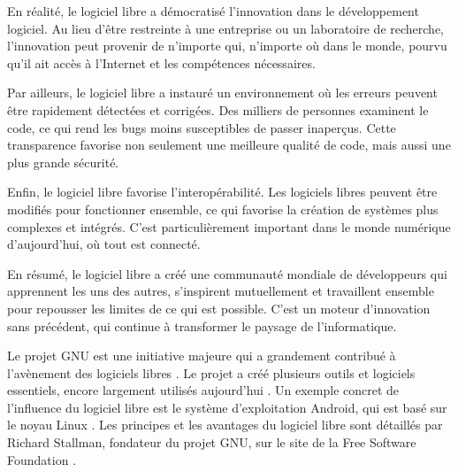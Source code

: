 En réalité, le logiciel libre a démocratisé l'innovation dans le développement logiciel. Au lieu d'être restreinte à une entreprise ou un laboratoire de recherche, l'innovation peut provenir de n'importe qui, n'importe où dans le monde, pourvu qu'il ait accès à l'Internet et les compétences nécessaires.

Par ailleurs, le logiciel libre a instauré un environnement où les erreurs peuvent être rapidement détectées et corrigées. Des milliers de personnes examinent le code, ce qui rend les bugs moins susceptibles de passer inaperçus. Cette transparence favorise non seulement une meilleure qualité de code, mais aussi une plus grande sécurité.

Enfin, le logiciel libre favorise l'interopérabilité. Les logiciels libres peuvent être modifiés pour fonctionner ensemble, ce qui favorise la création de systèmes plus complexes et intégrés. C'est particulièrement important dans le monde numérique d'aujourd'hui, où tout est connecté.

En résumé, le logiciel libre a créé une communauté mondiale de développeurs qui apprennent les uns des autres, s'inspirent mutuellement et travaillent ensemble pour repousser les limites de ce qui est possible. C'est un moteur d'innovation sans précédent, qui continue à transformer le paysage de l'informatique.

Le projet GNU est une initiative majeure qui a grandement contribué à l'avènement des logiciels libres \cite{GNU}. Le projet a créé plusieurs outils et logiciels essentiels, encore largement utilisés aujourd'hui \cite{GNU_packages}. Un exemple concret de l'influence du logiciel libre est le système d'exploitation Android, qui est basé sur le noyau Linux \cite{Android_Kernel}. Les principes et les avantages du logiciel libre sont détaillés par Richard Stallman, fondateur du projet GNU, sur le site de la Free Software Foundation \cite{FSF}.


%

